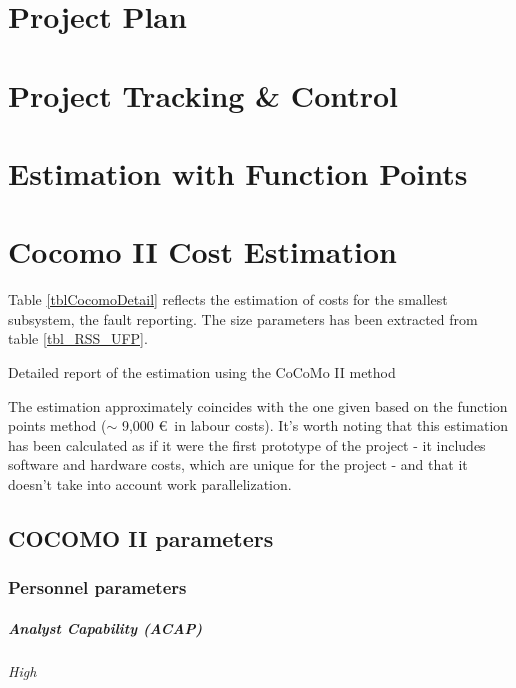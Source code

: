 \documentclass[11pt]{report}
\begin{document}
\chapter{Project Plan}
\label{chapPlan}



\chapter{Project Tracking \& Control}
\label{chapTracking}


\appendix

\chapter{Estimation with Function Points}
\label{chapFunctionPoints}


\chapter{Cocomo II Cost Estimation}
\label{chapCocomo}

Table \ref{tblCocomoDetail} reflects the estimation of costs for the smallest subsystem, the fault reporting. The size parameters has been extracted from table \ref{tbl_RSS_UFP}.

\begin{table}[hbtp]
\centering

\caption{Detailed report of the estimation using the CoCoMo II method}
\label{tblCocomoDetail}
\end{table}

The estimation approximately coincides with the one given based on the function points method ($\sim$ 9,000 \euro\ in labour costs). It's worth noting that this estimation has been calculated as if it were the first prototype of the project - it includes software and hardware costs, which are unique for the project - and that it doesn't take into account work parallelization.

\section{COCOMO II parameters}
\subsection{Personnel parameters}
\paragraph{Analyst Capability (ACAP) } \textit{High}
\end{document}
